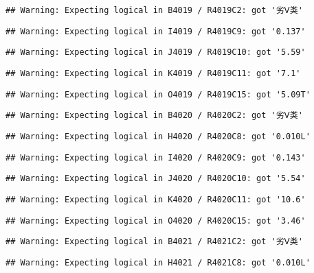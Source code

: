 \documentclass[
]{article}
\begin{document}
\begin{verbatim}
## Warning: Expecting logical in B4019 / R4019C2: got '劣Ⅴ类'
\end{verbatim}

\begin{verbatim}
## Warning: Expecting logical in I4019 / R4019C9: got '0.137'
\end{verbatim}

\begin{verbatim}
## Warning: Expecting logical in J4019 / R4019C10: got '5.59'
\end{verbatim}

\begin{verbatim}
## Warning: Expecting logical in K4019 / R4019C11: got '7.1'
\end{verbatim}

\begin{verbatim}
## Warning: Expecting logical in O4019 / R4019C15: got '5.09T'
\end{verbatim}

\begin{verbatim}
## Warning: Expecting logical in B4020 / R4020C2: got '劣Ⅴ类'
\end{verbatim}

\begin{verbatim}
## Warning: Expecting logical in H4020 / R4020C8: got '0.010L'
\end{verbatim}

\begin{verbatim}
## Warning: Expecting logical in I4020 / R4020C9: got '0.143'
\end{verbatim}

\begin{verbatim}
## Warning: Expecting logical in J4020 / R4020C10: got '5.54'
\end{verbatim}

\begin{verbatim}
## Warning: Expecting logical in K4020 / R4020C11: got '10.6'
\end{verbatim}

\begin{verbatim}
## Warning: Expecting logical in O4020 / R4020C15: got '3.46'
\end{verbatim}

\begin{verbatim}
## Warning: Expecting logical in B4021 / R4021C2: got '劣Ⅴ类'
\end{verbatim}

\begin{verbatim}
## Warning: Expecting logical in H4021 / R4021C8: got '0.010L'
\end{verbatim}
\end{document}
